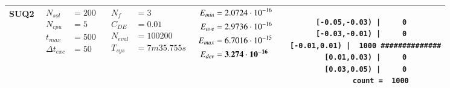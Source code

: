 \begin{table*} [!t]
\begin{tabular}[c]{ccccc}
\hline



SUQ2
&
{$\!\begin{aligned}
    N_{sol}        &= 200 \\
	N_{cpu}        &= 5 \\
	t_{max}        &= 500 \\
	\Delta t_{exc} &= 50
\end{aligned}$}
&
{$\!\begin{aligned}
	N_{f}    &= 3 \\
	C_{DE}   &= 0.01 \\
	N_{eval} &= 100200 \\
	T_{sys}  &= 7m35.755s
\end{aligned}$}
&
{$\!\begin{aligned}
    E_{min} &= 2.0724\cdot 10^{-16} \\
    E_{ave} &= 2.9736\cdot 10^{-16} \\
    E_{max} &= 6.7016\cdot 10^{-15} \\
    E_{dev} &= {\bf 3.274\cdot 10^{-16}}
\end{aligned}$}
&
\begin{minipage}{4.1cm} \fontsize{5pt}{6pt}
\begin{verbatim}
 [-0.05,-0.03) |     0 
 [-0.03,-0.01) |     0 
  [-0.01,0.01) |  1000 ##############
   [0.01,0.03) |     0 
   [0.03,0.05) |     0 
         count =  1000
 \end{verbatim}
\end{minipage} \\

\bottomrule


\end{tabular}
\label{tab:three-obj:A}
\end{table*}






